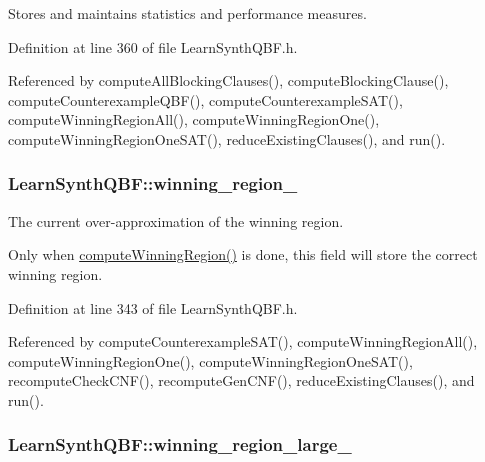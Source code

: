 Stores and maintains statistics and performance measures. 



Definition at line 360 of file Learn\-Synth\-Q\-B\-F.\-h.



Referenced by compute\-All\-Blocking\-Clauses(), compute\-Blocking\-Clause(), compute\-Counterexample\-Q\-B\-F(), compute\-Counterexample\-S\-A\-T(), compute\-Winning\-Region\-All(), compute\-Winning\-Region\-One(), compute\-Winning\-Region\-One\-S\-A\-T(), reduce\-Existing\-Clauses(), and run().

\hypertarget{classLearnSynthQBF_a9c6b41f7df5f4ed4bfc5930136fc1152}{
\subsubsection[{winning\-\_\-region\-\_\-}]{ Learn\-Synth\-Q\-B\-F\-::winning\-\_\-region\-\_\-\hspace{0.3cm}{\ttfamily [protected]}}}\label{classLearnSynthQBF_a9c6b41f7df5f4ed4bfc5930136fc1152}


The current over-\/approximation of the winning region. 

Only when \hyperlink{classLearnSynthQBF_ae8219ab3e4987775e1d6a006a9d38f4d}{compute\-Winning\-Region()} is done, this field will store the correct winning region. 

Definition at line 343 of file Learn\-Synth\-Q\-B\-F.\-h.



Referenced by compute\-Counterexample\-S\-A\-T(), compute\-Winning\-Region\-All(), compute\-Winning\-Region\-One(), compute\-Winning\-Region\-One\-S\-A\-T(), recompute\-Check\-C\-N\-F(), recompute\-Gen\-C\-N\-F(), reduce\-Existing\-Clauses(), and run().

\hypertarget{classLearnSynthQBF_aa9b460cdc140c3969a32ea77982181d2}{
\subsubsection[{winning\-\_\-region\-\_\-large\-\_\-}]{ Learn\-Synth\-Q\-B\-F\-::winning\-\_\-region\-\_\-large\-\_\-\hspace{0.3cm}{\ttfamily [protected]}}}\label{classLearnSynthQBF_aa9b460cdc140c3969a32ea77982181d2}


